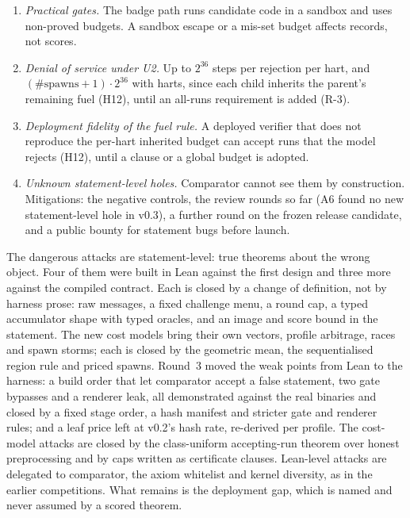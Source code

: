 \begin{enumerate}[nosep]
  gate (L15, fixed in round~4). The harness implements stages 0--2 and a badge hook; preflight, source
  policy and the badge checks are specified but not built (H-9).
\item \emph{Practical gates.} The badge path runs candidate code in a sandbox and uses non-proved
  budgets. A sandbox escape or a mis-set budget affects records, not scores.
\item \emph{Denial of service under U2.} Up to $2^{36}$ steps per rejection per hart, and
  $(\#\text{spawns}+1)\cdot2^{36}$ with harts, since each child inherits the parent's remaining fuel
  (H12), until an all-runs requirement is added (R-3).
\item \emph{Deployment fidelity of the fuel rule.} A deployed verifier that does not reproduce the
  per-hart inherited budget can accept runs that the model rejects (H12), until a 
  clause or a global budget is adopted.
\item \emph{Unknown statement-level holes.} Comparator cannot see them by construction. Mitigations:
  the negative controls, the review rounds so far (A6 found no new statement-level hole in v0.3), a
  further round on the frozen release candidate, and a public bounty for statement bugs before
  launch.
\end{enumerate}

\begin{takeaway}[Summary]
The dangerous attacks are statement-level: true theorems about the wrong object. Four of them were
built in Lean against the first design and three more against the compiled contract. Each is closed
by a change of definition, not by harness prose: raw messages, a fixed challenge menu, a round cap, a
typed accumulator shape with typed oracles, and an image and score bound in the statement. The new cost
models bring their own vectors, profile arbitrage, races and spawn storms; each is closed by the
geometric mean, the sequentialised region rule and priced spawns. Round~3 moved the weak points from
Lean to the harness: a build order that let comparator accept a false statement, two gate bypasses
and a renderer leak, all demonstrated against the real binaries and closed by a fixed stage order, a
hash manifest and stricter gate and renderer rules; and a leaf price left at v0.2's hash rate,
re-derived per profile. The
cost-model attacks are closed by the class-uniform accepting-run theorem over honest preprocessing and by
caps written as certificate clauses. Lean-level attacks are delegated to comparator, the axiom
whitelist and kernel diversity, as in the earlier competitions. What remains is the deployment gap,
which is named and never assumed by a scored theorem.
\end{takeaway}
